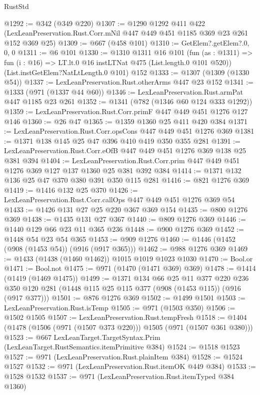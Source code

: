 \begin{lexlean}{RustStd}
\begin{coremodule}
@1292 := @342 (@349 @220)
@1307 := @1290
    @1292
    @411
    @422
    (LexLeanPreservation.Rust.Corr.mNil @447 @449 @451 @1185 @369 @23 @261 @152 @369 @25)
@1309 := @667 (@458 @101)
@1310 := GetElem?.getElem?.{0, 0, 0}
@1311 := @6 @101
@1330 := @1310
    @1311
    @16
    @101
    (fun (as : @1311) => fun (i : @16) => LT.lt.{0} @16 instLTNat @475 (List.length.{0} @101 @520))
    (List.instGetElem?NatLtLength.{0} @101)
    @152
@1333 := @1307 (@1309 (@1330 @54))
@1337 := LexLeanPreservation.Rust.otherArms @447 @23 @152
@1341 := @1333 (@971 (@1337 @44 @60))
@1346 := LexLeanPreservation.Rust.armPat @447 @1185 @23 @261
@1352 := @1341 (@782 (@1346 @60 @124 @333 @1292))
@1359 := LexLeanPreservation.Rust.Corr.primF @447 @449 @451 @1276 @127 @146
@1360 := @26 @47
@1365 := @1359 @1360 @25 @411 @420 @384
@1371 := LexLeanPreservation.Rust.Corr.opsCons @447 @449 @451 @1276 @369
@1381 := @1371 @138 @145 @25 @47 @396 @410 @419 @350 @355 @281
@1391 := LexLeanPreservation.Rust.Corr.eOfB @447 @449 @451 @1276 @369 @138 @25 @381 @394
@1404 := LexLeanPreservation.Rust.Corr.prim
    @447
    @449
    @451
    @1276
    @369
    @127
    @137
    @1360
    @25
    @381
    @392
    @384
@1414 := @1371 @132 @136 @25 @47 @370 @380 @391 @350 @115 @281
@1416 := @821 @1276 @369
@1419 := @1416 @132 @25 @370
@1426 := LexLeanPreservation.Rust.Corr.callOps @447 @449 @451 @1276 @369 @54
@1433 := @1426 @131 @27 @25 @220 @367 @369 @154
@1435 := @800 @1276 @369
@1438 := @1435 @131 @27 @367
@1440 := @809 @1276 @369
@1446 := @1440 @129 @66 @23 @11 @365 @236
@1448 := @900 @1276 @369
@1452 := @1448 @54 @23 @54 @365
@1453 := @909 @1276
@1460 := @1446 (@1452 (@908 (@1453 @54)) (@916 (@917 @365)))
@1462 := @988 @1276 @369
@1469 := @1433 (@1438 (@1460 @1462)) @1015 @1019 @1023 @1030
@1470 := Bool.or
@1471 := Bool.not
@1475 := @971 (@1470 (@1471 @369) @369)
@1478 := @1414 (@1419 (@1469 @1475))
@1499 := @1371
    @134
    @66
    @25
    @11
    @377
    @220
    @236
    @350
    @120
    @281
    (@1448 @115 @25 @115 @377 (@908 (@1453 @115)) (@916 (@917 @377)))
@1501 := @876 @1276 @369
@1502 := @1499 @1501
@1503 := LexLeanPreservation.Rust.isTemp
@1505 := @971 (@1503 @350)
@1506 := @1502 @1505
@1507 := LexLeanPreservation.Rust.tempFresh
@1518 := @1404 (@1478 (@1506 (@971 (@1507 @373 @220))) @1505 (@971 (@1507 @361 @380)))
@1523 := @667 LexLeanTarget.TargetSyntax.Prim (LexLeanTarget.RustSemantics.itemPrimitive @384)
@1524 := @1518 @1523
@1527 := @971 (LexLeanPreservation.Rust.plainItem @384)
@1528 := @1524 @1527
@1532 := @971 (LexLeanPreservation.Rust.itemOK @449 @384)
@1533 := @1528 @1532
@1537 := @971 (LexLeanPreservation.Rust.itemTyped @384 @1360)

\end{coremodule}
\end{lexlean}
